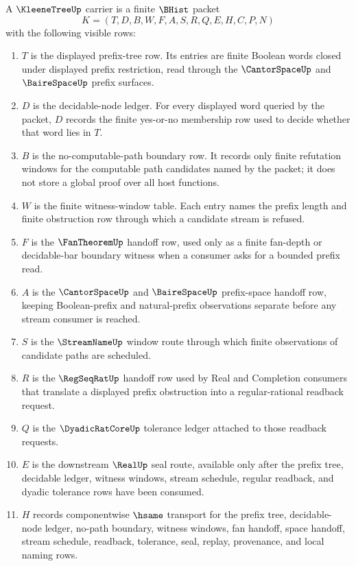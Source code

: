 \begin{definition}
\label{def:kleene-tree-carrier}
A $\KleeneTreeUp$ carrier is a finite $\BHist$ packet
$$
K=(T,D,B,W,F,A,S,R,Q,E,H,C,P,N)
$$
with the following visible rows:
\begin{enumerate}
\item $T$ is the displayed prefix-tree row. Its entries are finite Boolean words closed under displayed prefix restriction, read through the $\CantorSpaceUp$ and $\BaireSpaceUp$ prefix surfaces.
\item $D$ is the decidable-node ledger. For every displayed word queried by the packet, $D$ records the finite yes-or-no membership row used to decide whether that word lies in $T$.
\item $B$ is the no-computable-path boundary row. It records only finite refutation windows for the computable path candidates named by the packet; it does not store a global proof over all host functions.
\item $W$ is the finite witness-window table. Each entry names the prefix length and finite obstruction row through which a candidate stream is refused.
\item $F$ is the $\FanTheoremUp$ handoff row, used only as a finite fan-depth or decidable-bar boundary witness when a consumer asks for a bounded prefix read.
\item $A$ is the $\CantorSpaceUp$ and $\BaireSpaceUp$ prefix-space handoff row, keeping Boolean-prefix and natural-prefix observations separate before any stream consumer is reached.
\item $S$ is the $\StreamNameUp$ window route through which finite observations of candidate paths are scheduled.
\item $R$ is the $\RegSeqRatUp$ handoff row used by Real and Completion consumers that translate a displayed prefix obstruction into a regular-rational readback request.
\item $Q$ is the $\DyadicRatCoreUp$ tolerance ledger attached to those readback requests.
\item $E$ is the downstream $\RealUp$ seal route, available only after the prefix tree, decidable ledger, witness windows, stream schedule, regular readback, and dyadic tolerance rows have been consumed.
\item $H$ records componentwise $\hsame$ transport for the prefix tree, decidable-node ledger, no-path boundary, witness windows, fan handoff, space handoff, stream schedule, readback, tolerance, seal, replay, provenance, and local naming rows.

\end{enumerate}
\end{definition}
